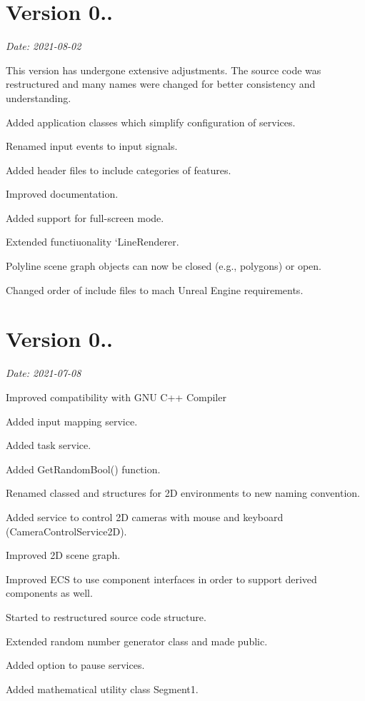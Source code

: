 \section*{Version 0..}

{\itshape Date\+: 2021-\/08-\/02}

This version has undergone extensive adjustments. The source code was restructured and many names were changed for better consistency and understanding.


\begin{DoxyItemize}
\item Added application classes which simplify configuration of services.
\item Renamed input events to input signals.
\item Added header files to include categories of features.
\item Improved documentation.
\item Added support for full-\/screen mode.
\item Extended functiuonality `\+Line\+Renderer\textquotesingle{}.
\item Polyline scene graph objects can now be closed (e.\+g., polygons) or open.
\item Changed order of include files to mach Unreal Engine requirements.
\end{DoxyItemize}

\section*{Version 0..}

{\itshape Date\+: 2021-\/07-\/08}


\begin{DoxyItemize}
\item Improved compatibility with G\+NU C++ Compiler
\item Added input mapping service.
\item Added task service.
\item Added {\ttfamily Get\+Random\+Bool()} function.
\item Renamed classed and structures for 2D environments to new naming convention.
\item Added service to control 2D cameras with mouse and keyboard ({\ttfamily Camera\+Control\+Service2D}).
\item Improved 2D scene graph.
\item Improved E\+CS to use component interfaces in order to support derived components as well.
\item Started to restructured source code structure.
\item Extended random number generator class and made public.
\item Added option to pause services.
\item Added mathematical utility class {\ttfamily Segment1}.
\end{DoxyItemize}

